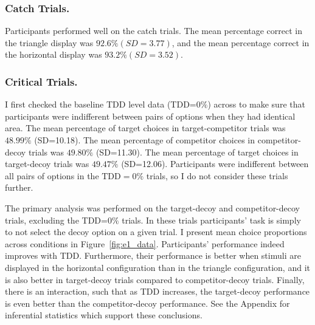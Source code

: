 \subsubsection{Catch Trials.}
Participants performed well on the catch trials. The mean percentage correct in the triangle display was $92.6\% (SD=3.77)$, and the mean percentage correct in the horizontal display was $93.2\% (SD=3.52)$. 

\subsubsection{Critical Trials.}
I first checked the baseline TDD level data (TDD=$0\%$) across to make sure that participants were indifferent between pairs of options when they had identical area. The mean percentage of target choices in target-competitor trials was $48.99\%$ (SD=10.18). The mean percentage of competitor choices in competitor-decoy trials was $49.80\%$ (SD=11.30). The mean percentage of target choices in target-decoy trials was $49.47\%$ (SD=12.06). Participants were indifferent between all pairs of options in the $\text{TDD}=0\%$ trials, so I do not consider these trials further.

The primary analysis was performed on the target-decoy and competitor-decoy trials, excluding the TDD=$0\%$ trials. In these trials participants' task is simply to not select the decoy option on a given trial. I present mean choice proportions across conditions in Figure~\ref{fig:e1_data}. Participants' performance indeed improves with TDD. Furthermore, their performance is better when stimuli are displayed in the horizontal configuration than in the triangle configuration, and it is also better in target-decoy trials compared to competitor-decoy trials. Finally, there is an interaction, such that as TDD increases, the target-decoy performance is even better than the competitor-decoy performance. See the Appendix for inferential statistics which support these conclusions.

